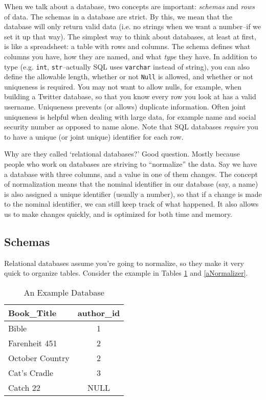 \documentclass[12pt,letter]{article}
\begin{document}
When we talk about a database, two concepts are important:
\emph{schemas} and \emph{rows} of data. The schemas in a database are
strict. By this, we mean that the database will only return valid data
(i.e. no strings when we want a number--if we set it up that way). The
simplest way to think about databases, at least at first, is like a
spreadsheet: a table with rows and columns. The schema defines what
columns you have, how they are named, and what \emph{type} they
have. In addition to type (e.g. \texttt{int}, \texttt{str}--actually
SQL uses \texttt{varchar} instead of string), you can
also define the allowable length, whether or not \texttt{Null} is
allowed, and whether or not uniqueness is required. You may not want to allow nulls, for example, when building a
Twitter database, so that you know every row you look at has a valid
username. Uniqueness prevents (or allows) duplicate information. Often
joint uniqueness is helpful when dealing with large data, for example
name and social security number as opposed to name alone. Note that
SQL databases \emph{require} you to have a unique (or joint unique)
identifier for each row. 

Why are they called `relational databases?' Good question. Mostly
because people who work on databases are striving to ``normalize'' the
data. Say we have a database with three columns, and a value in one of
them changes. The concept of normalization means that the nominal
identifier in our database (say, a name) is also assigned a unique
identifier (usually a number), so that if a change is made to the
nominal identifier, we can still keep track of what happened. It also
allows us to make changes quickly, and is optimized for both time and
memory.

\subsection{Schemas}
Relational databases assume you're going to normalize, so they make it
very quick to organize tables. Consider the example in Tables
\ref{aDatabase} and \ref{aNormalizer}.

\begin{table}[htbp]\centering
 \caption{An Example Database}
\label{aDatabase}
\begin{tabular}{l|c}\hline
Book\_Title & author\_id \\
\hline
Bible & 1 \\
Farenheit 451 & 2\\
October Country & 2\\
Cat's Cradle & 3 \\
Catch 22 & NULL \\
\end{tabular} \\
\end{table}
\end{document}
